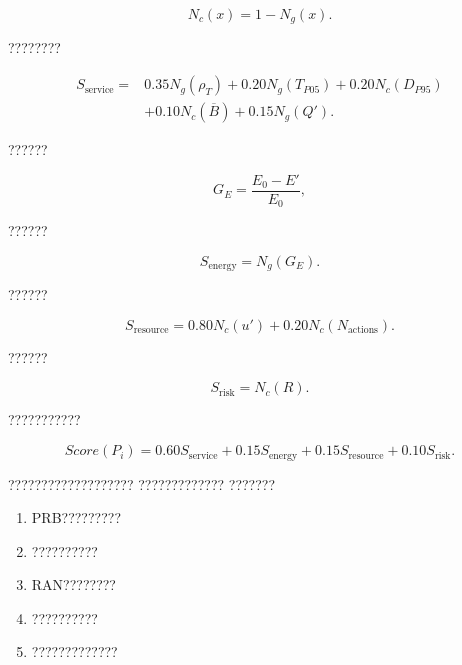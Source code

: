 \begin{equation}
N_c(x)
=
1-N_g(x).
\label{eq:cost_normalization_reduced}
\end{equation}

????????

\begin{equation}
\begin{aligned}
S_{\mathrm{service}}
={}&
0.35N_g(\rho_T)
+
0.20N_g(T_{P05})
+
0.20N_c(D_{P95})
\\
&+
0.10N_c(\overline{B})
+
0.15N_g(Q').
\end{aligned}
\label{eq:service_score_reduced}
\end{equation}

??????

\begin{equation}
G_E
=
\frac{
E_0-E'
}{
E_0
},
\label{eq:energy_gain_reduced}
\end{equation}

??????

\begin{equation}
S_{\mathrm{energy}}
=
N_g(G_E).
\label{eq:energy_score_reduced}
\end{equation}

??????

\begin{equation}
S_{\mathrm{resource}}
=
0.80N_c(u')
+
0.20N_c(N_{\mathrm{actions}}).
\label{eq:resource_score_reduced}
\end{equation}

??????

\begin{equation}
S_{\mathrm{risk}}
=
N_c(R).
\label{eq:risk_score_reduced}
\end{equation}

???????????

\begin{equation}
Score(P_i)
=
0.60S_{\mathrm{service}}
+
0.15S_{\mathrm{energy}}
+
0.15S_{\mathrm{resource}}
+
0.10S_{\mathrm{risk}}.
\label{eq:total_score_reduced}
\end{equation}

???????????????????
?????????????
???????

\begin{enumerate}[label=\arabic*)]
    \item PRB?????????
    \item ??????????
    \item RAN????????
    \item ??????????
    \item ?????????????
\end{enumerate}

